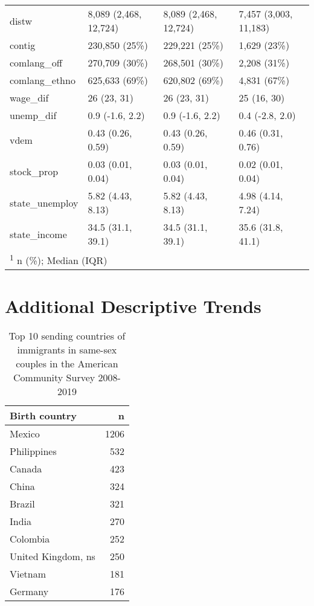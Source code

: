 \documentclass[
  11pt,
]{article}
\begin{document}
\begin{table}
\begin{tabular}[t]{llll}
distw & 8,089 (2,468, 12,724) & 8,089 (2,468, 12,724) & 7,457 (3,003, 11,183)\\
contig & 230,850 (25\%) & 229,221 (25\%) & 1,629 (23\%)\\
\addlinespace
comlang\_off & 270,709 (30\%) & 268,501 (30\%) & 2,208 (31\%)\\
comlang\_ethno & 625,633 (69\%) & 620,802 (69\%) & 4,831 (67\%)\\
wage\_dif & 26 (23, 31) & 26 (23, 31) & 25 (16, 30)\\
unemp\_dif & 0.9 (-1.6, 2.2) & 0.9 (-1.6, 2.2) & 0.4 (-2.8, 2.0)\\
vdem & 0.43 (0.26, 0.59) & 0.43 (0.26, 0.59) & 0.46 (0.31, 0.76)\\
\addlinespace
stock\_prop & 0.03 (0.01, 0.04) & 0.03 (0.01, 0.04) & 0.02 (0.01, 0.04)\\
state\_unemploy & 5.82 (4.43, 8.13) & 5.82 (4.43, 8.13) & 4.98 (4.14, 7.24)\\
state\_income & 34.5 (31.1, 39.1) & 34.5 (31.1, 39.1) & 35.6 (31.8, 41.1)\\
\bottomrule
\multicolumn{4}{l}{\rule{0pt}{1em}\textsuperscript{1} n (\%); Median (IQR)}\\
\end{tabular}
\end{table}

\newpage

\hypertarget{additional-descriptive-trends}{%
\section{Additional Descriptive Trends}\label{additional-descriptive-trends}}

\begin{table}

\caption{\label{tab:desc-top1}Top 10 sending countries of immigrants in same-sex couples in the American Community Survey 2008-2019}
\centering
\begin{tabular}[t]{lr}
\toprule
Birth country & n\\
\midrule
Mexico & 1206\\
Philippines & 532\\
Canada & 423\\
China & 324\\
Brazil & 321\\
\addlinespace
India & 270\\
Colombia & 252\\
United Kingdom, ns & 250\\
Vietnam & 181\\
Germany & 176\\
\bottomrule
\end{tabular}
\end{table}
\end{document}
